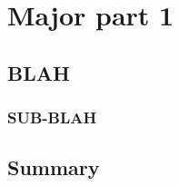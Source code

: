 \chapter{Major part 1}
\label{chap:chap3}

\textit{\fontsize{14pt}{\baselineskip}\selectfont{
		\lipsum[1]
}}
\newpage

\section{BLAH}
\lipsum[1]

\subsection{SUB-BLAH}
\lipsum[2]

\section{Summary}
\lipsum[3]

\cleardoublepage